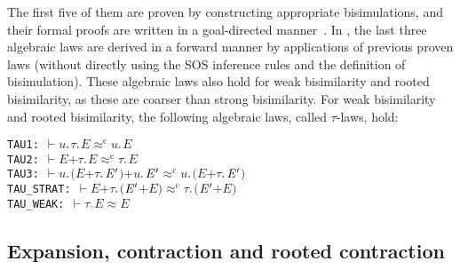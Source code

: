 \documentclass[GCNS]{yincog}
\renewcommand{\HOLFreeVar}[1]{\ensuremath{\mathit{#1}}}
\renewcommand{\HOLSymConst}[1]{#1}
\renewcommand{\HOLTokenTurnstile}{\ensuremath{\:\:\vdash}}
\theoremstyle{remark}
\theoremstyle{theorem}
\theoremstyle{remark}
\newcommand{\HOLTokenWeakEQ}{$\approx$}
\newcommand{\HOLTokenObsCongr}{$\approx^{\mathrm{c}}\!$}
\begin{document}
The first five of them are proven by constructing appropriate bisimulations,
and their formal proofs are written in a goal-directed manner~\citep[Chapter 4]{holdesc}.
In , the last three algebraic laws are derived in a forward manner
by applications of previous proven laws (without directly using the SOS
inference rules and the definition of bisimulation). These algebraic laws
also hold for weak bisimilarity and rooted bisimilarity, as these are coarser
than strong bisimilarity. For weak bisimilarity and rooted bisimilarity,
the following algebraic laws, called $\tau $-laws, hold:
%
\begin{alltt}
TAU1:      \HOLTokenTurnstile{} \HOLFreeVar{u}\HOLSymConst{\ensuremath{\ldotp}}\HOLSymConst{\ensuremath{\tau}}\HOLSymConst{\ensuremath{\ldotp}}\HOLFreeVar{E} \HOLSymConst{\HOLTokenObsCongr} \HOLFreeVar{u}\HOLSymConst{\ensuremath{\ldotp}}\HOLFreeVar{E}
TAU2:      \HOLTokenTurnstile{} \HOLFreeVar{E} \HOLSymConst{\ensuremath{+}} \HOLSymConst{\ensuremath{\tau}}\HOLSymConst{\ensuremath{\ldotp}}\HOLFreeVar{E} \HOLSymConst{\HOLTokenObsCongr} \HOLSymConst{\ensuremath{\tau}}\HOLSymConst{\ensuremath{\ldotp}}\HOLFreeVar{E}
TAU3:      \HOLTokenTurnstile{} \HOLFreeVar{u}\HOLSymConst{\ensuremath{\ldotp}}\ensuremath{(}\HOLFreeVar{E} \HOLSymConst{\ensuremath{+}} \HOLSymConst{\ensuremath{\tau}}\HOLSymConst{\ensuremath{\ldotp}}\ensuremath{\HOLFreeVar{E}\sp{\prime}}\ensuremath{)} \HOLSymConst{\ensuremath{+}} \HOLFreeVar{u}\HOLSymConst{\ensuremath{\ldotp}}\ensuremath{\HOLFreeVar{E}\sp{\prime}} \HOLSymConst{\HOLTokenObsCongr} \HOLFreeVar{u}\HOLSymConst{\ensuremath{\ldotp}}\ensuremath{(}\HOLFreeVar{E} \HOLSymConst{\ensuremath{+}} \HOLSymConst{\ensuremath{\tau}}\HOLSymConst{\ensuremath{\ldotp}}\ensuremath{\HOLFreeVar{E}\sp{\prime}}\ensuremath{)}
TAU\_STRAT: \HOLTokenTurnstile{} \HOLFreeVar{E} \HOLSymConst{\ensuremath{+}} \HOLSymConst{\ensuremath{\tau}}\HOLSymConst{\ensuremath{\ldotp}}\ensuremath{(}\ensuremath{\HOLFreeVar{E}\sp{\prime}} \HOLSymConst{\ensuremath{+}} \HOLFreeVar{E}\ensuremath{)} \HOLSymConst{\HOLTokenObsCongr} \HOLSymConst{\ensuremath{\tau}}\HOLSymConst{\ensuremath{\ldotp}}\ensuremath{(}\ensuremath{\HOLFreeVar{E}\sp{\prime}} \HOLSymConst{\ensuremath{+}} \HOLFreeVar{E}\ensuremath{)}
TAU\_WEAK:  \HOLTokenTurnstile{} \HOLSymConst{\ensuremath{\tau}}\HOLSymConst{\ensuremath{\ldotp}}\HOLFreeVar{E} \HOLSymConst{\HOLTokenWeakEQ} \HOLFreeVar{E}
\end{alltt}

\subsection{Expansion, contraction and rooted contraction}
 \label{sec4.5}
\end{document}
